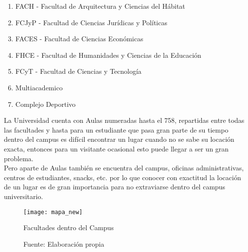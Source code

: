 \begin{enumerate}
\item FACH - Facultad de Arquitectura y Ciencias del Hábitat

\item FCJyP - Facultad de Ciencias Jurídicas y Políticas

\item FACES - Facultad de Ciencias Económicas


\item FHCE - Facultad de Humanidades y Ciencias de la Educación

\item FCyT - Facultad de Ciencias y Tecnología

\item Multiacademico
\item Complejo Deportivo


\end{enumerate}

La Universidad cuenta con Aulas numeradas hasta el 758, repartidas entre todas las facultades y hasta para un estudiante que pasa gran parte de su tiempo dentro del campus es difícil encontrar un lugar cuando no se sabe su locación exacta, entonces para un visitante ocasional esto puede llegar a ser un gran problema.\\

Pero aparte de Aulas también se encuentra del campus, oficinas administrativas, centros de estudiantes, snacks, etc. por lo que conocer con exactitud la locación de un lugar es de gran importancia para no extraviarse dentro del campus universitario.\\


\begin{figure}[H]
  \begin{center}
    \texttt{[image: mapa\_new]}
    \caption{Facultades dentro del Campus}
    \label{fig:mapa_new}
    \caption*{Fuente: Elaboración propia}

  \end{center}
\end{figure}


